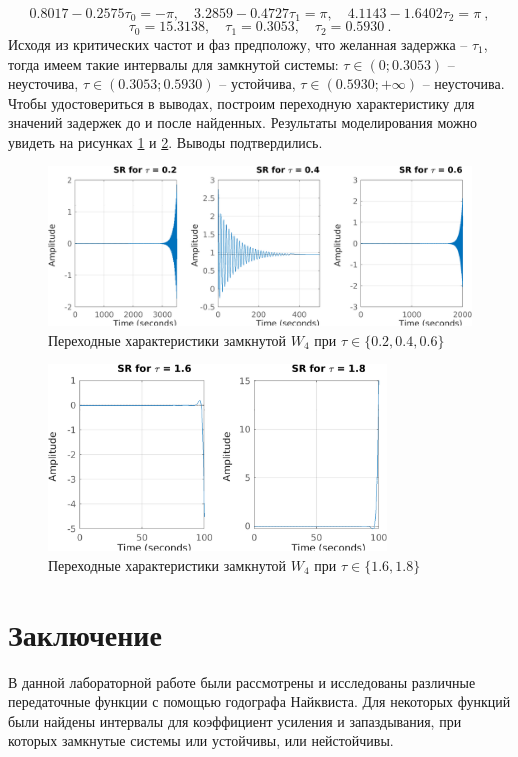 \begin{equation*}
    0.8017-0.2575\tau_0=-\pi,\quad
    3.2859-0.4727\tau_1=\pi,\quad
    4.1143-1.6402\tau_2=\pi\ ,
\end{equation*}
\begin{equation*}
    \tau_0=15.3138,\quad\tau_1=0.3053,\quad\tau_2=0.5930\ .
\end{equation*}
Исходя из критических частот и фаз предположу, что желанная задержка -- $\tau_1$,
тогда имеем такие интервалы для замкнутой системы: $\tau\in(0;0.3053)$ -- 
неусточива, $\tau\in(0.3053;0.5930)$ -- устойчива, $\tau\in(0.5930; +\infty)$ -- неусточива.
Чтобы удостовериться в выводах, построим переходную характеристику для
значений задержек до и после найденных. Результаты моделирования можно
увидеть на рисунках \ref{fig:W41_steps} и \ref{fig:W42_steps}. Выводы подтвердились.

\begin{figure}[H]
    \centering
    \includegraphics[width=\textwidth]{figs/task_3_W4_1_tausteps.png}
    \caption{Переходные характеристики замкнутой $W_4$ при $\tau\in\{0.2,0.4,0.6\}$}
    \label{fig:W41_steps}
\end{figure}

\begin{figure}[H]
    \centering
    \includegraphics[width=0.8\textwidth]{figs/task_3_W4_2_tausteps.png}
    \caption{Переходные характеристики замкнутой $W_4$ при $\tau\in\{1.6,1.8\}$}
    \label{fig:W42_steps}
\end{figure}


\section{Заключение}

В данной лабораторной работе были рассмотрены и исследованы 
различные передаточные функции с помощью годографа Найквиста.
Для некоторых функций были найдены интервалы для коэффициент 
усиления и запаздывания, при которых замкнутые системы или устойчивы, или
нейстойчивы.